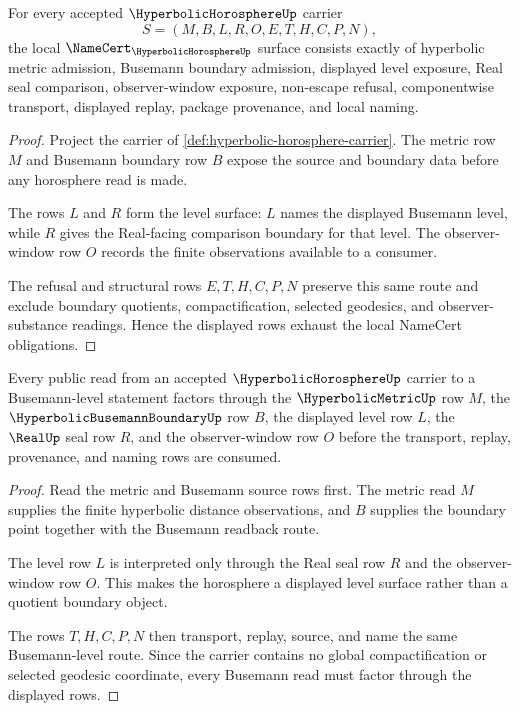 \begin{theorem}
\label{thm:hyperbolic-horosphere-namecert-obligations}
For every accepted $\HyperbolicHorosphereUp$ carrier
$$
S=(M,B,L,R,O,E,T,H,C,P,N),
$$
the local $\NameCert_{\HyperbolicHorosphereUp}$ surface consists exactly of hyperbolic metric admission, Busemann boundary admission, displayed level exposure, Real seal comparison, observer-window exposure, non-escape refusal, componentwise transport, displayed replay, package provenance, and local naming.
\end{theorem}
\begin{proof}
Project the carrier of \autoref{def:hyperbolic-horosphere-carrier}. The metric row $M$ and Busemann boundary row $B$ expose the source and boundary data before any horosphere read is made.

The rows $L$ and $R$ form the level surface: $L$ names the displayed Busemann level, while $R$ gives the Real-facing comparison boundary for that level. The observer-window row $O$ records the finite observations available to a consumer.

The refusal and structural rows $E,T,H,C,P,N$ preserve this same route and exclude boundary quotients, compactification, selected geodesics, and observer-substance readings. Hence the displayed rows exhaust the local NameCert obligations.
\end{proof}

\begin{theorem}
\label{thm:hyperbolic-horosphere-busemann-route}
Every public read from an accepted $\HyperbolicHorosphereUp$ carrier to a Busemann-level statement factors through the $\HyperbolicMetricUp$ row $M$, the $\HyperbolicBusemannBoundaryUp$ row $B$, the displayed level row $L$, the $\RealUp$ seal row $R$, and the observer-window row $O$ before the transport, replay, provenance, and naming rows are consumed.
\end{theorem}
\begin{proof}
Read the metric and Busemann source rows first. The metric read $M$ supplies the finite hyperbolic distance observations, and $B$ supplies the boundary point together with the Busemann readback route.

The level row $L$ is interpreted only through the Real seal row $R$ and the observer-window row $O$. This makes the horosphere a displayed level surface rather than a quotient boundary object.

The rows $T,H,C,P,N$ then transport, replay, source, and name the same Busemann-level route. Since the carrier contains no global compactification or selected geodesic coordinate, every Busemann read must factor through the displayed rows.
\end{proof}

